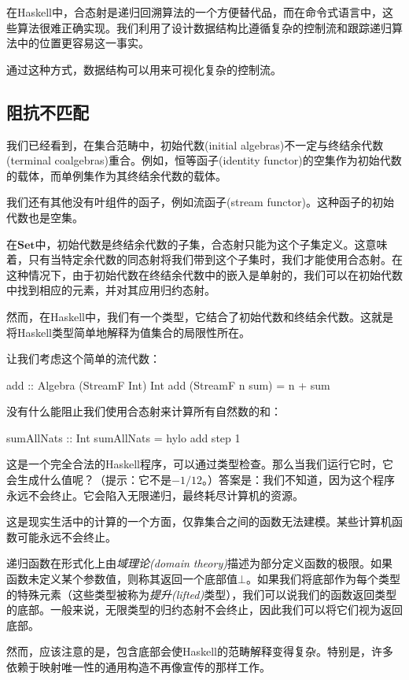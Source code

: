 \documentclass[DaoFP]{subfiles}
\begin{document}
在Haskell中，合态射是递归回溯算法的一个方便替代品，而在命令式语言中，这些算法很难正确实现。我们利用了设计数据结构比遵循复杂的控制流和跟踪递归算法中的位置更容易这一事实。

通过这种方式，数据结构可以用来可视化复杂的控制流。

\subsection{阻抗不匹配}

我们已经看到，在集合范畴中，初始代数(initial algebras)不一定与终结余代数(terminal coalgebras)重合。例如，恒等函子(identity functor)的空集作为初始代数的载体，而单例集作为其终结余代数的载体。

我们还有其他没有叶组件的函子，例如流函子(stream functor)。这种函子的初始代数也是空集。

在$\mathbf{Set}$中，初始代数是终结余代数的子集，合态射只能为这个子集定义。这意味着，只有当特定余代数的同态射将我们带到这个子集时，我们才能使用合态射。在这种情况下，由于初始代数在终结余代数中的嵌入是单射的，我们可以在初始代数中找到相应的元素，并对其应用归约态射。

然而，在Haskell中，我们有一个类型，它结合了初始代数和终结余代数。这就是将Haskell类型简单地解释为值集合的局限性所在。

让我们考虑这个简单的流代数：
\begin{haskell}
add :: Algebra (StreamF Int) Int
add (StreamF n sum) = n + sum
\end{haskell}
没有什么能阻止我们使用合态射来计算所有自然数的和：
\begin{haskell}
sumAllNats :: Int
sumAllNats = hylo add step 1
\end{haskell}
这是一个完全合法的Haskell程序，可以通过类型检查。那么当我们运行它时，它会生成什么值呢？（提示：它不是$-1/12$。）答案是：我们不知道，因为这个程序永远不会终止。它会陷入无限递归，最终耗尽计算机的资源。

这是现实生活中的计算的一个方面，仅靠集合之间的函数无法建模。某些计算机函数可能永远不会终止。

递归函数在形式化上由\emph{域理论(domain theory)}描述为部分定义函数的极限。如果函数未定义某个参数值，则称其返回一个底部值$\bot$。如果我们将底部作为每个类型的特殊元素（这些类型被称为\emph{提升(lifted)}类型），我们可以说我们的函数返回类型的底部。一般来说，无限类型的归约态射不会终止，因此我们可以将它们视为返回底部。

然而，应该注意的是，包含底部会使Haskell的范畴解释变得复杂。特别是，许多依赖于映射唯一性的通用构造不再像宣传的那样工作。
\end{document}
